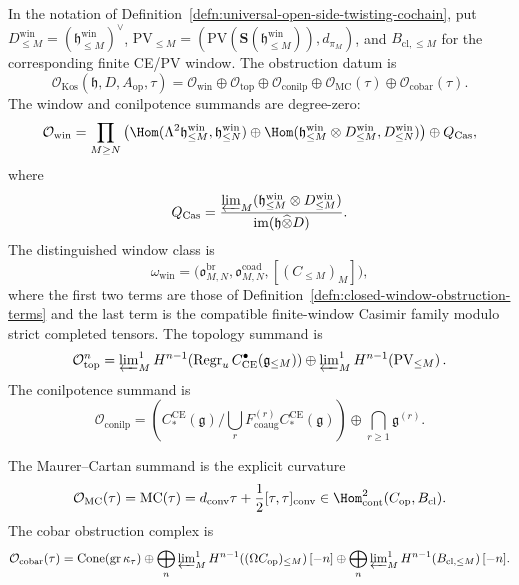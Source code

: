 \begin{defn}
\label{defn:universal-koszul-obstruction-complex}
  In the notation of
  Definition~\ref{defn:universal-open-side-twisting-cochain}, put
  \(D^{\mathrm{win}}_{\leq M}=(\mathfrak h^{\mathrm{win}}_{\leq M})^\vee\),
  \(\mathrm{PV}_{\leq M}=
  (\mathrm{PV}(\mathbf S(\mathfrak h^{\mathrm{win}}_{\leq M})),
  d_{\pi_M})\),
  and \(B_{\mathrm{cl},\leq M}\) for the corresponding finite CE/PV
  window.  The obstruction datum is
  \[
    \mathcal O_{\mathrm{Kos}}(\mathfrak h,D,A_{\mathrm{op}},\tau)
      =
      \mathcal O_{\mathrm{win}}
      \oplus
      \mathcal O_{\mathrm{top}}
      \oplus
      \mathcal O_{\mathrm{conilp}}
      \oplus
      \mathcal O_{\mathrm{MC}}(\tau)
      \oplus
      \mathcal O_{\mathrm{cobar}}(\tau).
  \]
  The window and conilpotence summands are degree-zero:
  \[
    \mathcal O_{\mathrm{win}}
      =
      \prod_{M\geq N}
      \left(
        \Hom(\Lambda^2\mathfrak h^{\mathrm{win}}_{\leq M},
          \mathfrak h^{\mathrm{win}}_{\leq N})
        \oplus
        \Hom(\mathfrak h^{\mathrm{win}}_{\leq M}\otimes
          D^{\mathrm{win}}_{\leq M},D^{\mathrm{win}}_{\leq N})
      \right)
      \oplus
      Q_{\mathrm{Cas}},
  \]
  where
  \[
    Q_{\mathrm{Cas}}
      =
      \frac{\varprojlim_M(\mathfrak h^{\mathrm{win}}_{\leq M}\otimes
        D^{\mathrm{win}}_{\leq M})}
           {\operatorname{im}(\mathfrak h\widehat\otimes D)} .
  \]
  The distinguished window class is
  \[
    \omega_{\mathrm{win}}
      =
      \bigl(
        \mathfrak o^{\mathrm{br}}_{M,N},
        \mathfrak o^{\mathrm{coad}}_{M,N},
        [(C_{\leq M})_M]
      \bigr),
  \]
  where the first two terms are those of
  Definition~\ref{defn:closed-window-obstruction-terms} and the last
  term is the compatible finite-window Casimir family modulo strict
  completed tensors.  The topology summand is
  \[
    \mathcal O_{\mathrm{top}}^n
      =
      \varprojlim\nolimits^1_M
        H^{n-1}\!\left(
          \operatorname{Regr}_u
          C^\bullet_{\mathrm{CE}}(\mathfrak g_{\leq M})\right)
      \oplus
      \varprojlim\nolimits^1_M
        H^{n-1}\!\left(\mathrm{PV}_{\leq M}\right).
  \]
  The conilpotence summand is
  \[
    \mathcal O_{\mathrm{conilp}}
      =
      \left(
        C_*^{\mathrm{CE}}(\mathfrak g)/
        \bigcup_rF^{(r)}_{\mathrm{coaug}}
          C_*^{\mathrm{CE}}(\mathfrak g)
      \right)
      \oplus
      \bigcap_{r\geq1}\mathfrak g^{(r)}.
  \]

  The Maurer--Cartan summand is the explicit curvature
  \[
    \mathcal O_{\mathrm{MC}}(\tau)
      =
      \operatorname{MC}(\tau)
      =
      d_{\mathrm{conv}}\tau+\frac12[\tau,\tau]_{\mathrm{conv}}
      \in
      \Hom^2_{\mathrm{cont}}(C_{\mathrm{op}},B_{\mathrm{cl}}).
  \]
  The cobar obstruction complex is
  \[
    \mathcal O_{\mathrm{cobar}}(\tau)
      =
      \operatorname{Cone}(\operatorname{gr}\kappa_\tau)
      \oplus
      \bigoplus_n
      \varprojlim\nolimits^1_M
        H^{n-1}\!\left((\Omega C_{\mathrm{op}})_{\leq M}\right)[-n]
      \oplus
      \bigoplus_n
      \varprojlim\nolimits^1_M
        H^{n-1}\!\left(B_{\mathrm{cl},\leq M}\right)[-n].
  \]
\end{defn}

